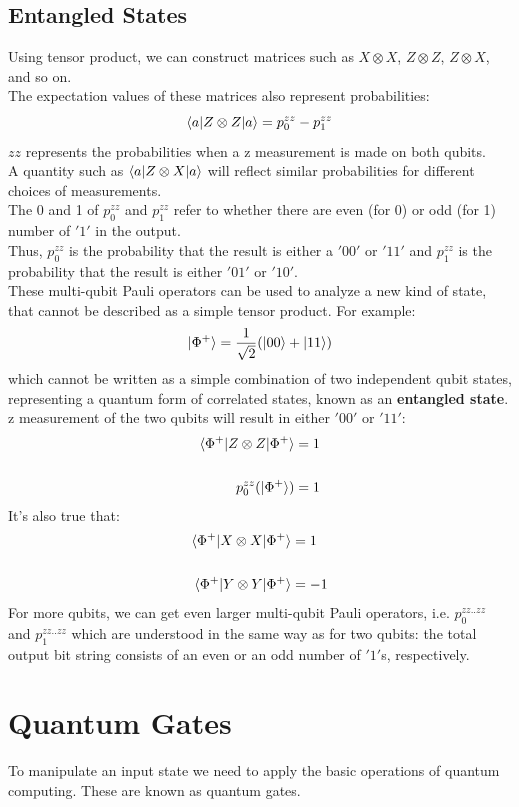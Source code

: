 \documentclass[hidelinks, a4paper, 12pt]{article}
\newcommand{\bd}{\textbf}
\newcommand{\n}{\\[\baselineskip]}
\begin{document}
        \subsection{Entangled States}
            Using tensor product, we can construct matrices such as $X \otimes X$, $Z \otimes Z$, $Z \otimes X$, and so on.\n
            The expectation values of these matrices also represent probabilities:
            \[\braket{a|Z \otimes Z|a} = p_0^{zz} - p_1^{zz}\]
            $zz$ represents the probabilities when a z measurement is made on both qubits.\n
            A quantity such as $\braket{a|Z \otimes X|a}$ will reflect similar probabilities for different choices of measurements.\n
            The 0 and 1 of $p_0^{zz}$ and $p_1^{zz}$ refer to whether there are even (for 0) or odd (for 1) number of $'1'$ in the output.\n
            Thus, $p_0^{zz}$ is the probability that the result is either a $'00'$ or $'11'$ and $p_1^{zz}$ is the probability that the result is either $'01'$ or $'10'$.\n
            These multi-qubit Pauli operators can be used to analyze a new kind of state, that cannot be described as a simple tensor product. For example:
            \[\ket{\Phi^+} = \frac{1}{\sqrt{2}}(\ket{00} + \ket{11})\]
            which cannot be written as a simple combination of two independent qubit states, representing a quantum form of correlated states, known as an \bd{entangled state}.\n
            z measurement of the two qubits will result in either $'00'$ or $'11'$:
            \[\begin{split}
                \braket{\Phi^+ | Z \otimes Z | \Phi^+} &= 1\n
                p_0^{zz}(\ket{\Phi^+}) &= 1\\
            \end{split}\]
            It's also true that:
            \[\begin{split}
                \braket{\Phi^+ | X \otimes X | \Phi^+} &= 1\n
                \braket{\Phi^+ | Y \otimes Y | \Phi^+} &= -1
            \end{split}\]
            For more qubits, we can get even larger multi-qubit Pauli operators, i.e. $p_0^{zz..zz}$ and $p_1^{zz..zz}$ which are understood in the same way as for two qubits: the total
            output bit string consists of an even or an odd number of $'1'$s, respectively.

    \section{Quantum Gates}
        To manipulate an input state we need to apply the basic operations of quantum computing. These are known as quantum gates.
\end{document}
